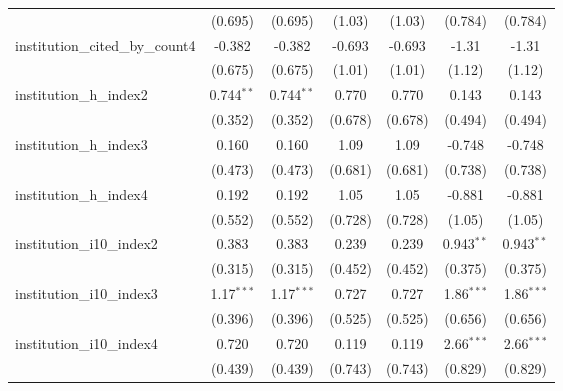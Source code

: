 \begin{tabular}{lcccccc}
                                         & (0.695)       & (0.695)       & (1.03)        & (1.03)        & (0.784)       & (0.784)\\   
   institution\_cited\_by\_count4        & -0.382        & -0.382        & -0.693        & -0.693        & -1.31         & -1.31\\   
                                         & (0.675)       & (0.675)       & (1.01)        & (1.01)        & (1.12)        & (1.12)\\   
   institution\_h\_index2                & 0.744$^{**}$  & 0.744$^{**}$  & 0.770         & 0.770         & 0.143         & 0.143\\   
                                         & (0.352)       & (0.352)       & (0.678)       & (0.678)       & (0.494)       & (0.494)\\   
   institution\_h\_index3                & 0.160         & 0.160         & 1.09          & 1.09          & -0.748        & -0.748\\   
                                         & (0.473)       & (0.473)       & (0.681)       & (0.681)       & (0.738)       & (0.738)\\   
   institution\_h\_index4                & 0.192         & 0.192         & 1.05          & 1.05          & -0.881        & -0.881\\   
                                         & (0.552)       & (0.552)       & (0.728)       & (0.728)       & (1.05)        & (1.05)\\   
   institution\_i10\_index2              & 0.383         & 0.383         & 0.239         & 0.239         & 0.943$^{**}$  & 0.943$^{**}$\\   
                                         & (0.315)       & (0.315)       & (0.452)       & (0.452)       & (0.375)       & (0.375)\\   
   institution\_i10\_index3              & 1.17$^{***}$  & 1.17$^{***}$  & 0.727         & 0.727         & 1.86$^{***}$  & 1.86$^{***}$\\   
                                         & (0.396)       & (0.396)       & (0.525)       & (0.525)       & (0.656)       & (0.656)\\   
   institution\_i10\_index4              & 0.720         & 0.720         & 0.119         & 0.119         & 2.66$^{***}$  & 2.66$^{***}$\\   
                                         & (0.439)       & (0.439)       & (0.743)       & (0.743)       & (0.829)       & (0.829)\\   

\end{tabular}
